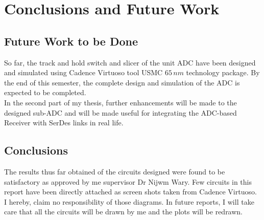 
\chapter{Conclusions and Future Work}
\graphicspath{{Conclusions and Future Work/Vector/}{Conclusions and Future Work/}}
\section{Future Work to be Done}

So far, the track and hold switch and slicer of the unit ADC have been designed and simulated using Cadence Virtuoso tool USMC $65\,nm$ technology package. By the end of this semester, the complete design and simulation of the ADC is expected to be completed. \\
In the second part of my thesis, further enhancements will be made to the designed sub-ADC and will be made useful for integrating the ADC-based Receiver with SerDes links in real life.



\section{Conclusions}
\label{Conclusions}

The results thus far obtained of the circuits designed were found to be satisfactory as approved by me supervisor Dr Nijwm Wary. Few circuits in this report have been directly attached as screen shots taken from Cadence Virtuoso. I hereby, claim no responsibility of those diagrams. In future reports, I will take care that all the circuits will be drawn by me and the plots will be redrawn.